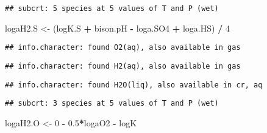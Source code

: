 \documentclass[]{article}
\newenvironment{Shaded}{\begin{snugshade}}{\end{snugshade}}
\newcommand{\KeywordTok}[1]{\textcolor[rgb]{0.13,0.29,0.53}{\textbf{#1}}}
\newcommand{\DataTypeTok}[1]{\textcolor[rgb]{0.13,0.29,0.53}{#1}}
\newcommand{\DecValTok}[1]{\textcolor[rgb]{0.00,0.00,0.81}{#1}}
\newcommand{\FloatTok}[1]{\textcolor[rgb]{0.00,0.00,0.81}{#1}}
\newcommand{\StringTok}[1]{\textcolor[rgb]{0.31,0.60,0.02}{#1}}
\newcommand{\OperatorTok}[1]{\textcolor[rgb]{0.81,0.36,0.00}{\textbf{#1}}}
\newcommand{\NormalTok}[1]{#1}
\begin{document}
\begin{verbatim}
## subcrt: 5 species at 5 values of T and P (wet)
\end{verbatim}

\begin{Shaded}
\begin{Highlighting}[]
\NormalTok{logaH2.S <-}\StringTok{ }\NormalTok{(logK.S }\OperatorTok{+}\StringTok{ }\NormalTok{bison.pH }\OperatorTok{-}\StringTok{ }\NormalTok{loga.SO4 }\OperatorTok{+}\StringTok{ }\NormalTok{loga.HS) }\OperatorTok{/}\StringTok{ }\DecValTok{4}
\end{Highlighting}
\end{Shaded}

\begin{Shaded}
\end{Shaded}

\begin{verbatim}
## info.character: found O2(aq), also available in gas
\end{verbatim}

\begin{verbatim}
## info.character: found H2(aq), also available in gas
\end{verbatim}

\begin{verbatim}
## info.character: found H2O(liq), also available in cr, aq
\end{verbatim}

\begin{verbatim}
## subcrt: 3 species at 5 values of T and P (wet)
\end{verbatim}

\begin{Shaded}
\begin{Highlighting}[]
\NormalTok{logaH2.O <-}\StringTok{ }\DecValTok{0} \OperatorTok{-}\StringTok{ }\FloatTok{0.5}\OperatorTok{*}\NormalTok{logaO2 }\OperatorTok{-}\StringTok{ }\NormalTok{logK}
\end{Highlighting}
\end{Shaded}
\end{document}
